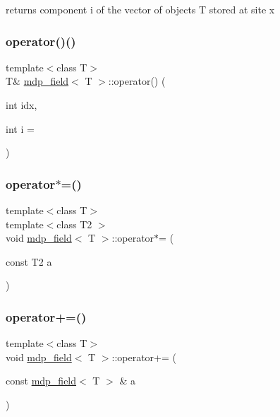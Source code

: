 returns component i of the vector of objects T stored at site x 

\mbox{\label{classmdp__field_ab99b7a328e1fa4be857fe72d180b0b35}} 
\subsubsection{\texorpdfstring{operator()()}{operator()()}\hspace{0.1cm}{\footnotesize\ttfamily [2/2]}}
{\footnotesize\ttfamily template$<$class T$>$ \\
T\& \hyperlink{classmdp__field}{mdp\+\_\+field}$<$ T $>$\+::operator() (\begin{DoxyParamCaption}\item[{int}]{idx,  }\item[{int}]{i = {} }\end{DoxyParamCaption})\hspace{0.3cm}{\ttfamily [inline]}}

\mbox{\label{classmdp__field_a4e844650a6b7a849207500c13c19e14a}} 
\subsubsection{\texorpdfstring{operator$\ast$=()}{operator*=()}}
{\footnotesize\ttfamily template$<$class T$>$ \\
template$<$class T2 $>$ \\
void \hyperlink{classmdp__field}{mdp\+\_\+field}$<$ T $>$\+::operator$\ast$= (\begin{DoxyParamCaption}\item[{const T2}]{a }\end{DoxyParamCaption})\hspace{0.3cm}{\ttfamily [inline]}}

\mbox{\label{classmdp__field_a274d9e292a6adc1703a5ad585c99036e}} 
\subsubsection{\texorpdfstring{operator+=()}{operator+=()}}
{\footnotesize\ttfamily template$<$class T$>$ \\
void \hyperlink{classmdp__field}{mdp\+\_\+field}$<$ T $>$\+::operator+= (\begin{DoxyParamCaption}\item[{const \hyperlink{classmdp__field}{mdp\+\_\+field}$<$ T $>$ \&}]{a }\end{DoxyParamCaption})\hspace{0.3cm}{\ttfamily [inline]}}

